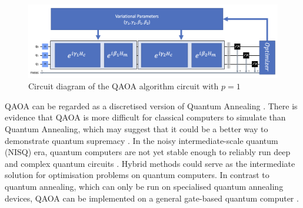 \begin{figure}[htb!]
    \centering
    \includegraphics[width=\linewidth]{images/qaoa_circuit.png}
    \caption{Circuit diagram of the QAOA algorithm circuit with $p=1$}
    \label{qaoacircuit}
\end{figure}

QAOA can be regarded as a discretised version of Quantum Annealing \cite{qaoareview}. There is evidence that QAOA is more difficult for classical computers to simulate than Quantum Annealing, which may suggest that it could be a better way to demonstrate quantum supremacy \cite{farhi2016quantum}. In the noisy intermediate-scale quantum (NISQ) era, quantum computers are not yet stable enough to reliably run deep and complex quantum circuits \cite{qaoareview}. Hybrid methods could serve as the intermediate solution for optimisation problems on quantum computers. In contrast to quantum annealing, which can only be run on specialised quantum annealing devices, QAOA can be implemented on a general gate-based quantum computer \cite{b22}. 